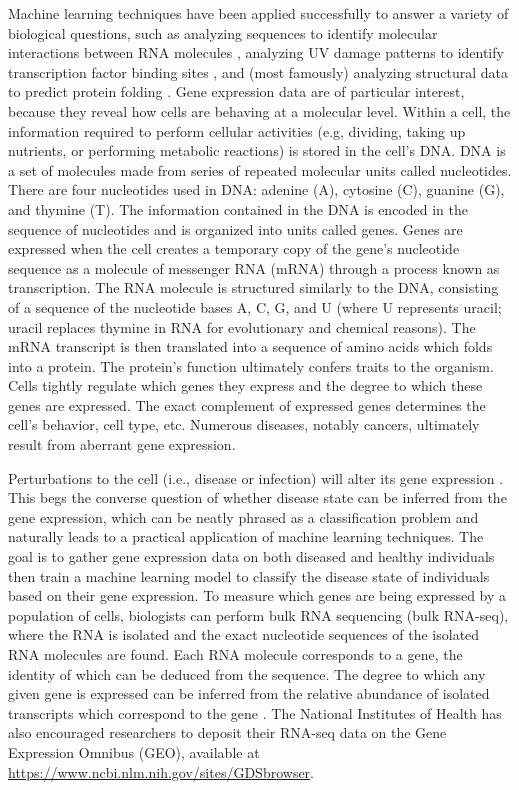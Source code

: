 \documentclass{article}
\begin{document}
Machine learning techniques have been applied successfully to answer a variety of biological questions, such as analyzing sequences to identify molecular interactions between RNA molecules \cite{TecLncMir}, analyzing UV damage patterns to identify transcription factor binding sites \cite{CPDTFBS}, and (most famously) analyzing structural data to predict protein folding \cite{AlphaFold}. Gene expression data are of particular interest, because they reveal how cells are behaving at a molecular level. Within a cell, the information required to perform cellular activities (e.g, dividing, taking up nutrients, or performing metabolic reactions) is stored in the cell's DNA. DNA is a set of molecules made from series of repeated molecular units called nucleotides. There are four nucleotides used in DNA: adenine (A), cytosine (C), guanine (G), and thymine (T). The information contained in the DNA is encoded in the sequence of nucleotides and is organized into units called genes. Genes are expressed when the cell creates a temporary copy of the gene's nucleotide sequence as a molecule of messenger RNA (mRNA) through a process known as transcription. The RNA molecule is structured similarly to the DNA, consisting of a sequence of the nucleotide bases A, C, G, and U (where U represents uracil; uracil replaces thymine in RNA for evolutionary and chemical reasons). The mRNA transcript is then translated into a sequence of amino acids which folds into a protein. The protein's function ultimately confers traits to the organism. Cells tightly regulate which genes they express and the degree to which these genes are expressed. The exact complement of expressed genes determines the cell's behavior, cell type, etc. Numerous diseases, notably cancers, ultimately result from aberrant gene expression. \cite{LewinsGenes}

Perturbations to the cell (i.e., disease or infection) will alter its gene expression \cite{LewinsGenes}. This begs the converse question of whether disease state can be inferred from the gene expression, which can be neatly phrased as a classification problem and naturally leads to a practical application of machine learning techniques. The goal is to gather gene expression data on both diseased and healthy individuals then train a machine learning model to classify the disease state of individuals based on their gene expression. To measure which genes are being expressed by a population of cells, biologists can perform bulk RNA sequencing (bulk RNA-seq), where the RNA is isolated and the exact nucleotide sequences of the isolated RNA molecules are found. Each RNA molecule corresponds to a gene, the identity of which can be deduced from the sequence. The degree to which any given gene is expressed can be inferred from the relative abundance of isolated transcripts which correspond to the gene \cite{RNAseq}. The National Institutes of Health has also encouraged researchers to deposit their RNA-seq data on the Gene Expression Omnibus (GEO), available at \url{https://www.ncbi.nlm.nih.gov/sites/GDSbrowser}.
\end{document}
